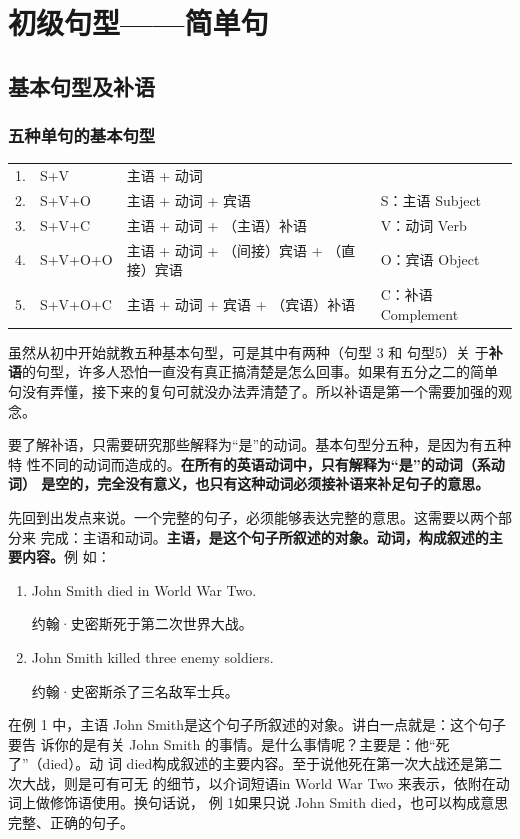 \part{初级句型——简单句}

\chapter{基本句型及补语}

\section{五种单句的基本句型}

\begin{longtable}[]{@{}llll@{}}
  1. & S+V & 主语 + 动词 & \\
  2. & S+V+O & 主语 + 动词 + 宾语 & S：主语 Subject \\
  3. & S+V+C & 主语 + 动词 + （主语）补语 & V：动词 Verb \\
  4. & S+V+O+O & 主语 + 动词 + （间接）宾语 + （直接）宾语 & O：宾语 Object \\
  5. & S+V+O+C & 主语 + 动词 + 宾语 + （宾语）补语 & C：补语 Complement
\end{longtable}

虽然从初中开始就教五种基本句型，可是其中有两种（句型 3 和 句型5）关
于\textbf{补语}的句型，许多人恐怕一直没有真正搞清楚是怎么回事。如果有五分之二的简单
句没有弄懂，接下来的复句可就没办法弄清楚了。所以补语是第一个需要加强的观念。

要了解补语，只需要研究那些解释为“是”的动词。基本句型分五种，是因为有五种特
性不同的动词而造成的。\textbf{在所有的英语动词中，只有解释为“是”的动词（系动词）
  是空的，完全没有意义，也只有这种动词必须接补语来补足句子的意思。}

先回到出发点来说。一个完整的句子，必须能够表达完整的意思。这需要以两个部分来
完成：主语和动词。\textbf{主语，是这个句子所叙述的对象。动词，构成叙述的主要内容。}例
如：

\begin{enumerate}
\item John Smith died in World War Two.

  约翰·史密斯死于第二次世界大战。
\item John Smith killed three enemy soldiers.

  约翰·史密斯杀了三名敌军士兵。
\end{enumerate}

在例 1 中，主语 John Smith是这个句子所叙述的对象。讲白一点就是：这个句子要告
诉你的是有关 John Smith 的事情。是什么事情呢？主要是：他“死了”（died）。动
词 died构成叙述的主要内容。至于说他死在第一次大战还是第二次大战，则是可有可无
的细节，以介词短语in World War Two 来表示，依附在动词上做修饰语使用。换句话说，
例 1如果只说 John Smith died，也可以构成意思完整、正确的句子。

